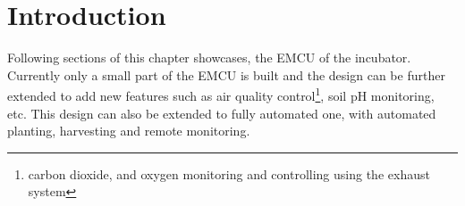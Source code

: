 \documentclass[../../main]{subfiles}
\begin{document}
\section{Introduction} \label{sec:}

Following sections of this chapter showcases, the EMCU of the incubator. Currently only a
small part of the EMCU is built and the design can be further extended to add new features
such as air quality control\footnote{carbon dioxide, and oxygen monitoring and controlling
using the exhaust system}, soil pH monitoring, etc. This design can also be extended to
fully automated one, with automated planting, harvesting and remote monitoring.
\end{document}
